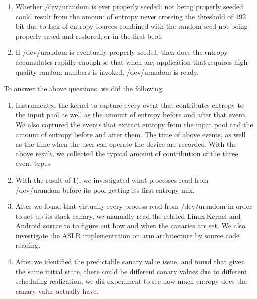\begin{enumerate}
\item Whether /dev/urandom is ever properly seeded: not being properly seeded could result from the amount of entropy never crossing the threshold of 192 bit due to lack of entropy sources combined with the random seed not being properly saved and restored, or in the first boot.

\item If /dev/urandom is eventually properly seeded, then does the entropy accumulates rapidly enough so that when any application that requires high quality random numbers is invoked, /dev/urandom is ready.

\end{enumerate}

To answer the above questions, we did the following:
\begin{enumerate}
\item Instrumented the kernel to capture every event that contributes entropy to the input pool as well as the amount of entropy before and after that event. We also captured the events that extract entropy from the input pool and the amount of entropy before and after them. The time of above events, as well as the time when the user can operate the device are recorded. With the above result, we collected the typical amount of contribution of the three event types.

\item With the result of 1), we investigated what processes read from /dev/urandom before its pool getting its first entropy mix.

\item After we found that virtually every process read from /dev/urandom in order to set up its stack canary, we manually read the related Linux Kernel and Android source to to figure out how and when the canaries are set. We also investigate the ASLR implementation on arm architecture by source code reading.

\item After we identified the predictable canary value issue, and found that given the same initial state, there could be different canary values due to different scheduling realization, we did experiment to see how much entropy does the canary value actually have.

\end{enumerate}




